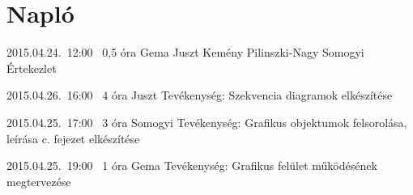 %
\section{Napló}

\begin{naplo}

\bejegyzes
{2015.04.24.~12:00~} %
{0,5 óra} %
{Gema\newline
Juszt\newline
Kemény\newline
Pilinszki-Nagy\newline
Somogyi} %
{Értekezlet} %

\bejegyzes
{2015.04.26.~16:00~}
{4 óra}
{Juszt}
{Tevékenység: Szekvencia diagramok elkészítése}

\bejegyzes
{2015.04.25.~17:00~}
{3 óra}
{Somogyi}
{Tevékenység: Grafikus objektumok felsorolása, leírása c. fejezet elkészítése}

\bejegyzes
{2015.04.25.~19:00~}
{1 óra}
{Gema}
{Tevékenység: Grafikus felület működésének megtervezése}





\end{naplo}

